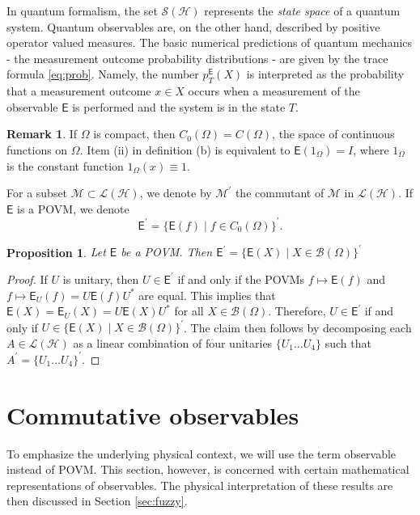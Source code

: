 \documentclass[12pt]{amsart}
\newtheorem{proposition}{Proposition}
\theoremstyle{definition}
\newtheorem{remark}{Remark}
\newcommand{\lh}{\mathcal{L(H)}} %
\newcommand{\sh}{\mathcal{S(H)}} %
\newcommand{\Eo}{\mathsf{E}} %
\newcommand{\bor}[1]{\mathcal{B}(#1)} %
\begin{document}
In quantum formalism, the set $\sh$ represents the \emph{state space} of a quantum system. Quantum observables are, on the other hand, described by positive operator valued measures. The basic numerical predictions of quantum mechanics - the measurement outcome probability distributions - are given by the trace formula \eqref{eq:prob}. Namely, the number $p^{\Eo}_T (X)$ is interpreted as the probability that a measurement outcome $ x\in X$ occurs when a measurement of the observable $\Eo$ is performed and the system is in the state $T$.

\begin{remark}
If $\Omega$ is compact, then $C_0 (\Omega) = C (\Omega)$, the space of
continuous functions on $\Omega$. Item {\rm (ii)} in definition {\rm (b)} is
equivalent to $\Eo (1_{\Omega}) = I$, where $1_{\Omega}$ is the constant function $1_{\Omega}( x)\equiv 1$.
\end{remark}

For a subset $\mathcal{M}\subset\lh$, we denote by $\mathcal{M}^\prime$ the commutant of $\mathcal{M}$ in $\lh$. If $\Eo$ is a POVM, we denote
\begin{equation}\label{def-E'}
\Eo^\prime = \{ \Eo (f) \mid f\in C_0 (\Omega) \}^\prime .
\end{equation}

\begin{proposition}
Let $\Eo$ be a POVM. Then $\Eo^\prime = \{ \Eo (X) \mid X\in \bor{\Omega} \}^\prime$
\end{proposition}

\begin{proof}
If $U$ is unitary, then $U\in\Eo^\prime$ if and only if the POVMs $f\mapsto \Eo (f)$ and $f\mapsto \Eo_U (f) = U \Eo (f) U^\ast$ are equal. This implies that $\Eo (X) = \Eo_U (X) = U \Eo (X) U^\ast$ for all $X\in\bor{\Omega}$. Therefore, $U\in\Eo^\prime$ if and only if $U\in \{ \Eo (X) \mid X\in \bor{\Omega} \}^\prime$. The claim then follows by decomposing each $A\in\lh$ as a linear combination of four unitaries $\{ U_1 \ldots U_4 \}$ such that $A^\prime = \{ U_1 \ldots U_4 \}^\prime$.
\end{proof}


\section{Commutative observables}\label{sec:commutative}

To emphasize the underlying physical context, we will use the term observable instead of POVM. This section, however, is concerned with certain mathematical representations of observables. The physical interpretation of these results are then discussed in Section \ref{sec:fuzzy}.
\end{document}
